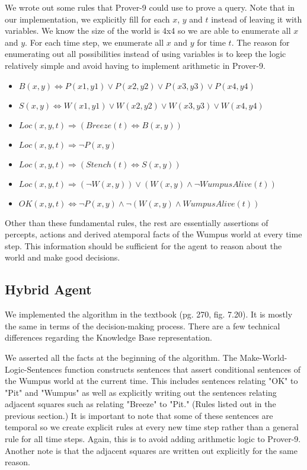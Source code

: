 We wrote out some rules that Prover-9 could use to prove a query. Note that in our implementation, we explicitly fill for each $x$, $y$ and $t$ instead of leaving it with variables. We know the size of the world is 4x4 so we are able to enumerate all $x$ and $y$. For each time step, we enumerate all $x$ and $y$ for time $t$. The reason for enumerating out all possibilities instead of using variables is to keep the logic relatively simple and avoid having to implement arithmetic in Prover-9.

\begin{itemize}
	\item $B(x,y) \Leftrightarrow P(x1,y1) \vee P(x2,y2) \vee P(x3,y3) \vee P(x4,y4)$
        \item $S(x,y) \Leftrightarrow W(x1,y1) \vee W(x2,y2) \vee W(x3,y3) \vee W(x4,y4)$
        \item $Loc(x,y,t) \Rightarrow (Breeze(t) \Leftrightarrow B(x,y))$
        \item $Loc(x,y,t) \Rightarrow \neg P(x,y)$
        \item $Loc(x,y,t) \Rightarrow (Stench(t) \Leftrightarrow S(x,y))$
        \item $Loc(x,y,t) \Rightarrow (\neg W(x,y)) \vee (W(x,y) \wedge \neg WumpusAlive(t))$
        \item $OK(x,y,t) \Leftrightarrow \neg P(x,y) \wedge \neg(W(x,y) \wedge WumpusAlive(t))$
\end{itemize}

Other than these fundamental rules, the rest are essentially assertions of percepts, actions and derived atemporal facts of the Wumpus world at every time step. This information should be sufficient for the agent to reason about the world and make good decisions.

\subsection{Hybrid Agent}

We implemented the algorithm in the textbook (pg. 270, fig. 7.20). It is mostly the same in terms of the decision-making process. There are a few technical differences regarding the Knowledge Base representation.

We asserted all the facts at the beginning of the algorithm. The Make-World-Logic-Sentences function constructs sentences that assert conditional sentences of the Wumpus world at the current time. This includes sentences relating "OK" to "Pit" and "Wumpus" as well as explicitly writing out the sentences relating adjacent squares such as relating "Breeze" to "Pit." (Rules listed out in the previous section.)  It is important to note that some of these sentences are temporal so we create explicit rules at every new time step rather than a general rule for all time steps. Again, this is to avoid adding arithmetic logic to Prover-9. Another note is that the adjacent squares are written out explicitly for the same reason.

